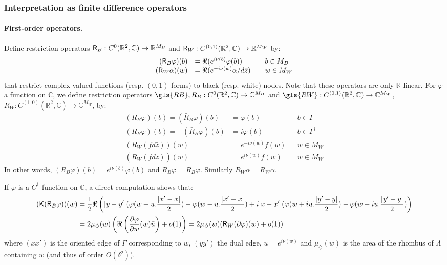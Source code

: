 \documentclass[10pt]{article}
\newcommand{\R}{\mathbb{R}}
\newcommand{\C}{\mathbb{C}}
\newcommand{\rK}{{\sf K}}
\newcommand{\rR}{{\sf R}}
\newcommand{\dg}{\dagger}
\newcommand{\dmd}{\diamondsuit}
\newcommand{\dbar}{\bar\partial}
\begin{document}
\subsubsection{Interpretation as finite difference operators}\label{sss:finitediff}

\paragraph{First-order operators.\\}

%



Define restriction operators $\rR_B: C^0(\R^2,\C)\rightarrow \R^{ M_B}$ and $\rR_W: C^{(0,1)}(\R^2,\C)\rightarrow\R^{ M_W}$ by:
%
%
%
%
%
\begin{equation}\label{eq:Rrestrop}
\begin{array}{rlll}
(\rR_B\varphi)(b)&=\Re(e^{i\nu(b)}\varphi(b))&&b\in M_B\\
(\rR_W\alpha)(w)&=\Re(e^{-i\nu(w)}\alpha/d\bar z) &&w\in M_W
\end{array}
\end{equation}
that restrict complex-valued functions (resp. $(0,1)$-forms) to black (resp. white) nodes. Note that these operators are only $\R$-linear. 
For $\varphi$ a function on $\C$, we define restriction operators $\gls{RB},\bar R_B: C^0(\R^2,\C)\rightarrow \C^{ M_B}$ and $\gls{RW}: C^{(0,1)}(\R^2,\C)\rightarrow\C^{ M_W}$, $\bar R_W: C^{(1,0)}(\R^2,\C)\rightarrow\C^{ M_W}$,  by:
\begin{equation}\label{eq:Crestrop}
\begin{array}{rlll}
%
(R_B\varphi)(b)=(\bar R_B\varphi)(b)&=\varphi(b)&&b\in \Gamma\\
(R_B\varphi)(b)=-(\bar R_B\varphi)(b)&=i\varphi(b)&&b\in \Gamma^\dg\\
(R_W(fd\bar z))(w)&=e^{-i\nu(w)}f(w) &&w\in M_W\\
(\bar R_W(fdz))(w)&=e^{i\nu(w)}f(w) &&w\in M_W
\end{array}
%
\end{equation}
In other words, $(R_B\varphi)(b)=e^{i\nu(b)}\varphi(b)$ and $\bar R_B\bar\varphi=\overline{R_B\varphi}$. Similarly $\bar R_W\bar\alpha=\overline{R_W\alpha}$.
%


If $\varphi$ is a $C^1$ function on $\C$, a direct computation shows that:
\begin{align*}
(\rK(\rR_B\varphi))(w)&=
\frac 12\Re\left( |y-y'|(\varphi(w+u.\frac{|x'-x|}2)-\varphi(w-u.\frac{|x'-x|}2)+i|x-x'|(\varphi(w+iu.\frac{|y'-y|}2)-\varphi(w-iu.\frac{|y'-y|}2)\right)\\
%
&=2\mu_\dmd(w)\left(\Re\left(\frac{\partial\varphi}{\partial{\bar w}}(w)\bar u\right)+o(1)\right)=2\mu_\dmd(w)(\rR_W(\dbar\varphi)(w)+o(1))
\end{align*}
where $(xx')$ is the oriented edge of $\Gamma$ corresponding to $w$, $(yy')$ the dual edge, $u=e^{i\nu(w)}$ and $\mu_\dmd(w)$ is the area of the rhombus of $\Lambda$ containing $w$ (and thus of order $O(\delta^2)$).
\end{document}
